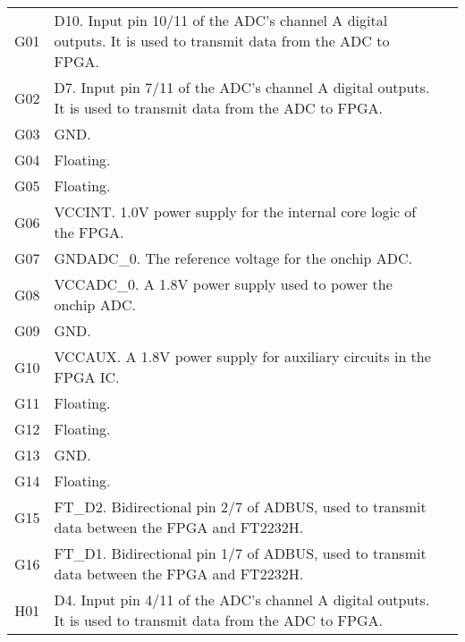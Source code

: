 \begin{tabularx}{\textwidth}{c X>{\raggedright\arraybackslash}X}
        G01 & D10. Input pin 10/11 of the ADC's channel A digital outputs. It is used to transmit data
        from the ADC to FPGA. \\
        G02 & D7. Input pin 7/11 of the ADC's channel A digital outputs. It is used to transmit data from
        the ADC to FPGA. \\
        G03 & GND. \\
        G04 & Floating. \\
        G05 & Floating. \\
        G06 & VCCINT. 1.0V power supply for the internal core logic of the FPGA. \\
        G07 & GNDADC\_0. The reference voltage for the onchip ADC. \\
        G08 & VCCADC\_0. A 1.8V power supply used to power the onchip ADC. \\
        G09 & GND. \\
        G10 & VCCAUX. A 1.8V power supply for auxiliary circuits in the FPGA IC. \\
        G11 & Floating. \\
        G12 & Floating. \\
        G13 & GND. \\
        G14 & Floating. \\
        G15 & FT\_D2. Bidirectional pin 2/7 of ADBUS, used to transmit data between the FPGA and
        FT2232H. \\
        G16 & FT\_D1. Bidirectional pin 1/7 of ADBUS, used to transmit data between the FPGA and
        FT2232H. \\

        \midrule

        H01 & D4. Input pin 4/11 of the ADC's channel A digital outputs. It is used to transmit data from
        the ADC to FPGA. \\


\end{tabularx}
